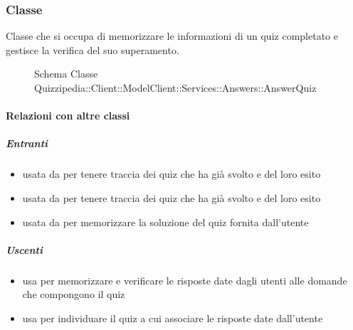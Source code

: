 \subsubsection{Classe }
Classe che si occupa di memorizzare le informazioni di un quiz completato e gestisce la verifica del suo superamento.
\begin{figure}[H]
\centering
\noindent{}
\caption[Schema Classe AnswerQuiz]{Schema Classe Quizzipedia::Client::ModelClient::Services::Answers::AnswerQuiz}
\end{figure}
\paragraph{Relazioni con altre classi}
\subparagraph{Entranti}
\begin{itemize}
\item usata da  per tenere traccia dei quiz che ha già svolto e del loro esito
\item usata da  per tenere traccia dei quiz che ha già svolto e del loro esito
\item usata da  per memorizzare la soluzione del quiz fornita dall'utente
\end{itemize}
\subparagraph{Uscenti}
\begin{itemize}
\item usa  per memorizzare e verificare le risposte date dagli utenti alle domande che compongono il quiz
\item usa  per individuare il quiz a cui associare le risposte date dall'utente
\end{itemize}
